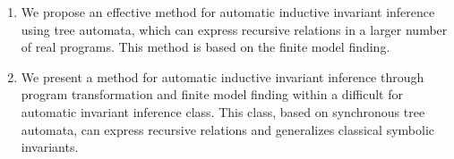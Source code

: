 {}
\begin{enumerate}[beginpenalty=10000] %
  \item We propose an effective method for automatic inductive invariant inference using tree automata, which can express recursive relations in a larger number of real programs. This method is based on the finite model finding.
  \item We present a method for automatic inductive invariant inference through program transformation and finite model finding within a difficult for automatic invariant inference class. This class, based on synchronous tree automata, can express recursive relations and generalizes classical symbolic invariants.

\end{enumerate}

